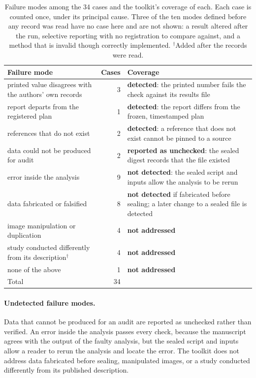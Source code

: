 \vspace{0.5em}
\begin{table}[h]
\centering
\small
\caption{Failure modes among the 34 cases and the toolkit's coverage of each. Each case is
counted once, under its principal cause. Three of the ten modes defined before any record was read have no case here and are not shown: a result altered after the run, selective reporting with no registration to compare against, and a method that is invalid though correctly implemented. $^{\dagger}$Added after the records were read.}
\label{tab:fc-modes}
\begin{tabular}{@{}>{\raggedright\arraybackslash}p{}r>{\raggedright\arraybackslash}p{}@{}}
\toprule
\textbf{Failure mode} & \textbf{Cases} & \textbf{Coverage} \\
\midrule
printed value disagrees with the authors' own records & 3 & \textbf{detected}: the printed number fails the check against its results file \\
report departs from the registered plan & 1 & \textbf{detected}: the report differs from the frozen, timestamped plan \\
references that do not exist & 2 & \textbf{detected}: a reference that does not exist cannot be pinned to a source \\
\midrule
data could not be produced for audit & 2 & \textbf{reported as unchecked}: the sealed digest records that the file existed \\
error inside the analysis & 9 & \textbf{not detected}: the sealed script and inputs allow the analysis to be rerun \\
data fabricated or falsified & 8 & \textbf{not detected} if fabricated before sealing; a later change to a sealed file is detected \\
\midrule
image manipulation or duplication & 4 & \textbf{not addressed} \\
study conducted differently from its description$^{\dagger}$ & 4 & \textbf{not addressed} \\
none of the above & 1 & \textbf{not addressed} \\
\midrule
Total & 34 & \\
\bottomrule
\end{tabular}
\end{table}

\paragraph{Undetected failure modes.} Data that cannot be produced for an audit are reported as
unchecked rather than verified. An error inside the analysis passes every check, because the
manuscript agrees with the output of the faulty analysis, but the sealed script and inputs
allow a reader to rerun the analysis and locate the error. The toolkit does not address data
fabricated before sealing, manipulated images, or a study conducted differently from its
published description.

